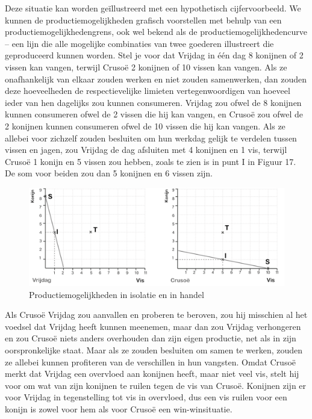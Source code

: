 Deze situatie kan worden geïllustreerd met een hypothetisch cijfervoorbeeld. We kunnen de productiemogelijkheden grafisch voorstellen met behulp van een productiemogelijkhedengrens, ook wel bekend als de productiemogelijkhedencurve -- een lijn die alle mogelijke combinaties van twee goederen illustreert die geproduceerd kunnen worden. Stel je voor dat Vrijdag in één dag 8 konijnen of 2 vissen kan vangen, terwijl Crusoë 2 konijnen of 10 vissen kan vangen. Als ze onafhankelijk van elkaar zouden werken en niet zouden samenwerken, dan zouden deze hoeveelheden de respectievelijke limieten vertegenwoordigen van hoeveel ieder van hen dagelijks zou kunnen consumeren. Vrijdag zou ofwel de 8 konijnen kunnen consumeren ofwel de 2 vissen die hij kan vangen, en Crusoë zou ofwel de 2 konijnen kunnen consumeren ofwel de 10 vissen die hij kan vangen. Als ze allebei voor zichzelf zouden besluiten om hun werkdag gelijk te verdelen tussen vissen en jagen, zou Vrijdag de dag afsluiten met 4 konijnen en 1 vis, terwijl Crusoë 1 konijn en 5 vissen zou hebben, zoals te zien is in punt I in Figuur 17. De som voor beiden zou dan 5 konijnen en 6 vissen zijn.

\begin{figure}[!htb]
\centering
    \includegraphics[width=\textwidth]{figures/fig17-1.png}
    \caption[Productiemogelijkheden in isolatie en in handel.]{Productiemogelijkheden in isolatie en in handel}
    \label{fig17}
\end{figure}

Als Crusoë Vrijdag zou aanvallen en proberen te beroven, zou hij misschien al het voedsel dat Vrijdag heeft kunnen meenemen, maar dan zou Vrijdag verhongeren en zou Crusoë niets anders overhouden dan zijn eigen productie, net als in zijn oorspronkelijke staat. Maar als ze zouden besluiten om samen te werken, zouden ze allebei kunnen profiteren van de verschillen in hun vangsten. Omdat Crusoë merkt dat Vrijdag een overvloed aan konijnen heeft, maar niet veel vis, stelt hij voor om wat van zijn konijnen te ruilen tegen de vis van Crusoë. Konijnen zijn er voor Vrijdag in tegenstelling tot vis in overvloed, dus een vis ruilen voor een konijn is zowel voor hem als voor Crusoë een win-winsituatie.

